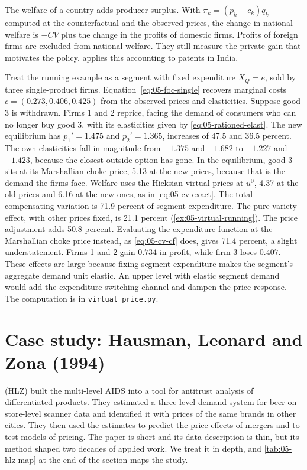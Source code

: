The welfare of a country adds producer surplus. With $\pi_k = (p_k - c_k)q_k$ computed at the counterfactual
and the observed prices, the change in national welfare is $-CV$ plus the change in the profits of domestic
firms. Profits of foreign firms are excluded from national welfare. They still measure the private gain that
motivates the policy.  applies this accounting to patents in India.

\begin{example}\label{ex:05-withdrawal}
Treat the running example as a segment with fixed expenditure $X_Q = e$, sold by three single-product firms.
Equation~\eqref{eq:05-foc-single} recovers marginal costs $c = (0.273, 0.406, 0.425)$ from the observed prices and
elasticities. Suppose good 3 is withdrawn. Firms 1 and 2 reprice, facing the demand of consumers who can no
longer buy good 3, with its elasticities given by \eqref{eq:05-rationed-elast}. The new equilibrium has
$p_1' = 1.475$ and $p_2' = 1.365$, increases of 47.5 and 36.5 percent. The own elasticities fall in magnitude
from $-1.375$ and $-1.682$ to $-1.227$ and $-1.423$, because the closest outside option has gone. In the
equilibrium, good 3 sits at its Marshallian choke price, 5.13 at the new prices, because that is the demand
the firms face. Welfare uses the Hicksian virtual prices at $u^0$, 4.37 at the old prices and 6.16 at the new
ones, as in \eqref{eq:05-cv-exact}. The total compensating variation is 71.9 percent of segment expenditure.
The pure variety effect, with other prices fixed, is 21.1 percent (\cref{ex:05-virtual-running}). The price
adjustment adds 50.8 percent. Evaluating the expenditure function at the Marshallian choke price instead, as
\eqref{eq:05-cv-cf} does, gives 71.4 percent, a slight understatement. Firms 1 and 2 gain
$0.734$ in profit, while firm 3 loses $0.407$. These effects are large because fixing segment expenditure makes
the segment's aggregate demand unit elastic. An upper level with elastic segment demand would add the
expenditure-switching channel and dampen the price response. The computation is in \texttt{virtual\_price.py}.
\end{example}

\section{Case study: Hausman, Leonard and Zona (1994)}\label{sec:05-hlz}

\citet{HausmanLeonardZona1994} (HLZ) built the multi-level AIDS into a tool for antitrust analysis of
differentiated products. They estimated a three-level demand system for beer on store-level scanner data and
identified it with prices of the same brands in other cities. They then used the estimates to predict the price
effects of mergers and to test models of pricing. The paper is short and its data description is thin, but its
method shaped two decades of applied work. We treat it in depth, and \cref{tab:05-hlz-map} at the end of the
section maps the study.

